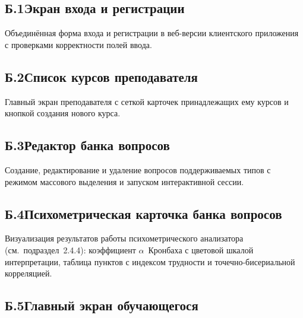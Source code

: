 \subsection*{Б.1\quad Экран входа и регистрации}

Объединённая форма входа и регистрации в веб-версии клиентского
приложения с проверками корректности полей ввода.


\subsection*{Б.2\quad Список курсов преподавателя}

Главный экран преподавателя с сеткой карточек принадлежащих ему
курсов и кнопкой создания нового курса.


\subsection*{Б.3\quad Редактор банка вопросов}

Создание, редактирование и удаление вопросов поддерживаемых типов
с режимом массового выделения и запуском интерактивной сессии.


\subsection*{Б.4\quad Психометрическая карточка банка вопросов}

Визуализация результатов работы психометрического анализатора
(см.~подраздел~2.4.4): коэффициент $\alpha$~Кронбаха с цветовой
шкалой интерпретации, таблица пунктов с индексом трудности
и точечно-бисериальной корреляцией.


\subsection*{Б.5\quad Главный экран обучающегося}

